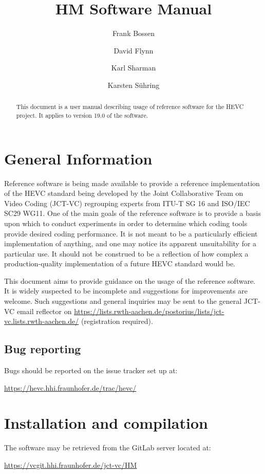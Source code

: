 \documentclass[a4paper,11pt]{jvetdoc}
\title{HM Software Manual}
\author{%
	Frank Bossen
	\email{frank@bossentech.com}
	\and
	David Flynn
	\email{dflynn@blackberry.com}
	\and
	Karl Sharman
	\email{karl.sharman@eu.sony.com}
	\and
	Karsten S\"uhring
	\email{karsten.suehring@hhi.fraunhofer.de}
}
\begin{document}
\maketitle
\begin{abstract}
This document is a user manual describing usage of reference software
for the HEVC project. It applies to version 19.0
of the software.
\end{abstract}

\tableofcontents
\listoftables



\section{General Information}
Reference software is being made available to provide a reference
implementation of the HEVC standard being developed by the Joint
Collaborative Team on Video Coding (JCT-VC) regrouping experts from
ITU-T SG 16 and ISO/IEC SC29 WG11. One of the main goals of the
reference software is to provide a basis upon which to conduct
experiments in order to determine which coding tools provide desired
coding performance. It is not meant to be a particularly efficient
implementation of anything, and one may notice its apparent
unsuitability for a particular use. It should not be construed to be a
reflection of how complex a production-quality implementation of a
future HEVC standard would be.

This document aims to provide guidance on the usage of the reference
software. It is widely suspected to be incomplete and suggestions for
improvements are welcome. Such suggestions and general inquiries may be
sent to the general JCT-VC email reflector on
\url{https://lists.rwth-aachen.de/postorius/lists/jct-vc.lists.rwth-aachen.de/} 
(registration required).

\subsection*{Bug reporting}
Bugs should be reported on the issue tracker set up at:

\url{https://hevc.hhi.fraunhofer.de/trac/hevc/}

\section{Installation and compilation}
The software may be retrieved from the GitLab server located at:

\url{https://vcgit.hhi.fraunhofer.de/jct-vc/HM}
\end{document}
